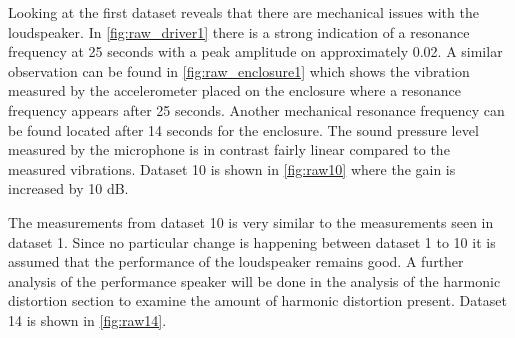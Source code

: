 Looking at the first dataset reveals that there are mechanical issues with the loudspeaker. In \autoref{fig:raw_driver1} there is a strong indication of a resonance frequency at 25 seconds with a peak amplitude on approximately 0.02. A similar observation can be found in \autoref{fig:raw_enclosure1} which shows the vibration measured by the accelerometer placed on the enclosure where a resonance frequency appears after 25 seconds. Another mechanical resonance frequency can be found located after 14 seconds for the enclosure. The sound pressure level measured by the microphone is in contrast fairly linear compared to the measured vibrations. Dataset 10 is shown in \autoref{fig:raw10} where the gain is increased by 10 dB.

%	
%	
%	

The measurements from dataset 10 is very similar to the measurements seen in dataset 1. Since no particular change is happening between dataset 1 to 10 it is assumed that the performance of the loudspeaker remains good. A further analysis of the performance speaker will be done in the analysis of the harmonic distortion section to examine the amount of harmonic distortion present. Dataset 14 is shown in \autoref{fig:raw14}. 

